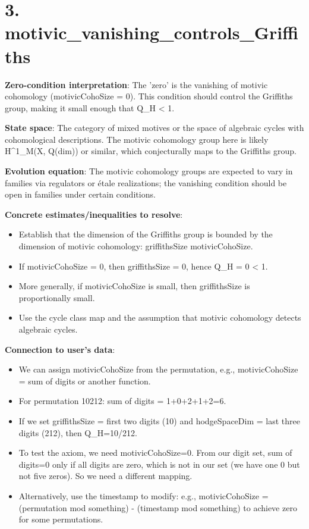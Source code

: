 \documentclass[11pt]{article}
\begin{document}
\section{3. motivic\_vanishing\_controls\_Griffiths}

\textbf{Zero-condition interpretation}: The 'zero' is the vanishing of motivic cohomology (motivicCohoSize = 0). This condition should control the Griffiths group, making it small enough that Q\_H < 1.

\textbf{State space}: The category of mixed motives or the space of algebraic cycles with cohomological descriptions. The motivic cohomology group here is likely H^1\_M(X, Q(dim)) or similar, which conjecturally maps to the Griffiths group.

\textbf{Evolution equation}: The motivic cohomology groups are expected to vary in families via regulators or étale realizations; the vanishing condition should be open in families under certain conditions.

\textbf{Concrete estimates/inequalities to resolve}:
\begin{itemize}
\item Establish that the dimension of the Griffiths group is bounded by the dimension of motivic cohomology: griffithsSize \leq motivicCohoSize.
\item If motivicCohoSize = 0, then griffithsSize = 0, hence Q\_H = 0 < 1.
\item More generally, if motivicCohoSize is small, then griffithsSize is proportionally small.
\item Use the cycle class map and the assumption that motivic cohomology detects algebraic cycles.
\end{itemize}

\textbf{Connection to user's data}:
\begin{itemize}
\item We can assign motivicCohoSize from the permutation, e.g., motivicCohoSize = sum of digits or another function.
\item For permutation 10212: sum of digits = 1+0+2+1+2=6.
\item If we set griffithsSize = first two digits (10) and hodgeSpaceDim = last three digits (212), then Q\_H=10/212.
\item To test the axiom, we need motivicCohoSize=0. From our digit set, sum of digits=0 only if all digits are zero, which is not in our set (we have one 0 but not five zeros). So we need a different mapping.
\item Alternatively, use the timestamp to modify: e.g., motivicCohoSize = (permutation mod something) - (timestamp mod something) to achieve zero for some permutations.
\end{itemize}
\end{document}
